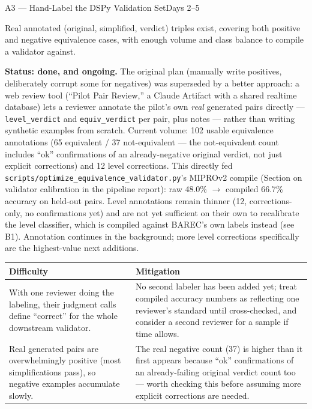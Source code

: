 \documentclass[11pt,a4paper]{article}
\begin{document}
\newpage
\begin{milestonehead}{A3 --- Hand-Label the DSPy Validation Set}{Days 2--5}
\begin{goalbox}
Real annotated (original, simplified, verdict) triples exist, covering
both positive and negative equivalence cases, with enough volume and class
balance to compile a validator against.
\end{goalbox}

\textbf{Status: done, and ongoing.} The original plan (manually write
positives, deliberately corrupt some for negatives) was superseded by a
better approach: a web review tool (``Pilot Pair Review,'' a Claude
Artifact with a shared realtime database) lets a reviewer annotate the
pilot's own \emph{real} generated pairs directly --- \texttt{level\_verdict}
and \texttt{equiv\_verdict} per pair, plus notes --- rather than writing
synthetic examples from scratch. Current volume: 102 usable equivalence
annotations (65 equivalent / 37 not-equivalent --- the not-equivalent count
includes ``ok'' confirmations of an already-negative original verdict, not
just explicit corrections) and 12 level corrections. This directly fed
\texttt{scripts/optimize\_equivalence\_validator.py}'s MIPROv2 compile
(Section on validator calibration in the pipeline report): raw 48.0\%
$\to$ compiled 66.7\% accuracy on held-out pairs. Level annotations remain
thinner (12, corrections-only, no confirmations yet) and are not yet
sufficient on their own to recalibrate the level classifier, which is
compiled against BAREC's own labels instead (see B1). Annotation continues
in the background; more level corrections specifically are the highest-value
next additions.

\begin{center}
\small
\begin{tabular}{@{}p{6.3cm}p{6.9cm}@{}}
\toprule
\textbf{Difficulty} & \textbf{Mitigation} \\
\midrule
With one reviewer doing the labeling, their judgment calls define
``correct'' for the whole downstream validator. & No second labeler has
been added yet; treat compiled accuracy numbers as reflecting one
reviewer's standard until cross-checked, and consider a second reviewer
for a sample if time allows. \\
\addlinespace
Real generated pairs are overwhelmingly positive (most simplifications
pass), so negative examples accumulate slowly. & The real negative count
(37) is higher than it first appears because ``ok'' confirmations of an
already-failing original verdict count too --- worth checking this before
assuming more explicit corrections are needed. \\
\bottomrule
\end{tabular}
\end{center}
\end{milestonehead}
\end{document}
